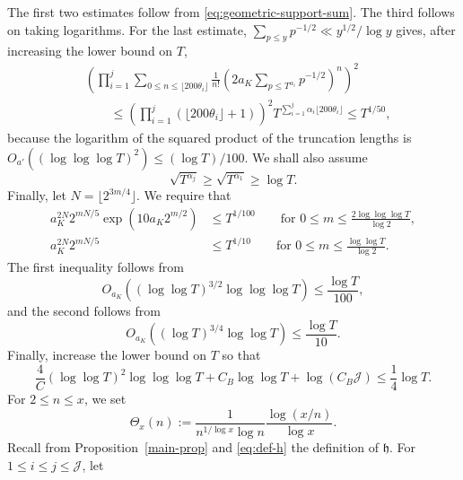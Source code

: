 \documentclass[twoside,reqno,11pt,a4paper]{amsart}
\numberwithin{equation}{section}
\theoremstyle{plain}
\theoremstyle{definition}
\theoremstyle{remark}
\renewcommand{\le}{\leqslant}
\renewcommand{\ge}{\geqslant}
\begin{document}
    The first two estimates follow from \eqref{eq:geometric-support-sum}.
    The third follows on taking logarithms.  For the last estimate,
    $\sum_{p\le y}p^{-1/2}\ll y^{1/2}/\log y$ gives, after increasing the
    lower bound on $T$,
    \begin{align*}
    &\left(\prod_{i=1}^j
    \sum_{0\le n\le\lfloor200\theta_i\rfloor}
    \frac1{n!}\left(2a_K\sum_{p\le T^{\alpha_i}}p^{-1/2}\right)^n
    \right)^2\\
    &\qquad\le
    \left(\prod_{i=1}^j(\lfloor200\theta_i\rfloor+1)\right)^2
    T^{\sum_{i=1}^j\alpha_i\lfloor200\theta_i\rfloor}
    \le T^{1/50},
    \end{align*}
    because the logarithm of the squared product of the truncation lengths
    is $O_{a'}((\log\log\log T)^2)\le(\log T)/100$.  We shall also assume
    \begin{equation}\label{eq:square-root-range}
            \sqrt{T^{\alpha_j}}\ge\sqrt{T^{\alpha_1}}\ge\log T.
    \end{equation}
    Finally, let $N=\lfloor2^{3m/4}\rfloor$. We require that
    \begin{align}
        a_K^{2N}2^{mN/5}\exp\left(10a_K2^{m/2}\right)
        &\le T^{1/100}
        \qquad \text{for }0\le m\le\frac{2\log\log\log T}{\log2},\nonumber\\
        a_K^{2N}2^{mN/5}
        &\le T^{1/10} \qquad \text{for }
        0\le m\le\frac{\log\log T}{\log2}.
        \label{eq:numerical-square-growth}
    \end{align}
   The first inequality follows from
   \begin{equation*}
   O_{a_K}((\log\log T)^{3/2}\log\log\log T)
   \le\frac{\log T}{100},
   \end{equation*}
   and the second follows from
   \begin{equation*}
   O_{a_K}((\log T)^{3/4}\log\log T)
   \le\frac{\log T}{10}.
   \end{equation*}
   Finally, increase the lower bound on $T$ so that
   \begin{equation}\label{eq:explicit-error-absorption}
   \frac4C(\log\log T)^2\log\log\log T
   +C_B\log\log T+\log(C_B\mathcal J)
   \le\frac14\log T.
   \end{equation}
    For $2\le n\le x$, we set \begin{equation*}
		\Theta_x(n):= \frac{1}{n^{1/\log x}\log n}\frac{\log(x/n)}{\log x}.
	\end{equation*}
	 Recall from Proposition~\ref{main-prop} and \eqref{eq:def-h} the definition of $\mathfrak h$. For $1\le  i\le  j\le  \mathcal{J}$, let
\end{document}
